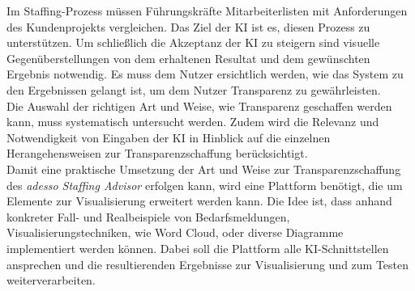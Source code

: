 \documentclass[a4paper,12pt]{scrreprt}
\begin{document}
Im \glqq Staffing\grqq{}-Prozess müssen Führungskräfte Mitarbeiterlisten mit Anforderungen des Kundenprojekts vergleichen. Das Ziel der KI ist es, diesen Prozess zu unterstützen. Um schließlich die Akzeptanz der KI zu steigern sind visuelle Gegenüberstellungen von dem erhaltenen Resultat und dem gewünschten Ergebnis notwendig. Es muss dem Nutzer ersichtlich werden, wie das System zu den Ergebnissen gelangt ist, um dem Nutzer Transparenz zu gewährleisten. \\

Die Auswahl der richtigen Art und Weise, wie Transparenz geschaffen werden kann, muss systematisch untersucht werden. Zudem wird die Relevanz und Notwendigkeit von Eingaben der KI in Hinblick auf die einzelnen Herangehensweisen zur Transparenzschaffung berücksichtigt. \\

Damit eine praktische Umsetzung der Art und Weise zur Transparenzschaffung des \emph{adesso Staffing Advisor} erfolgen kann, wird eine Plattform benötigt, die um Elemente zur Visualisierung erweitert werden kann. Die Idee ist, dass anhand konkreter Fall- und Realbeispiele von Bedarfsmeldungen, Visualisierungstechniken, wie \glqq Word Cloud\grqq{}, oder diverse Diagramme implementiert werden können. Dabei soll die Plattform alle KI-Schnittstellen ansprechen und die resultierenden Ergebnisse zur Visualisierung und zum Testen weiterverarbeiten.
\newpage
\end{document}

